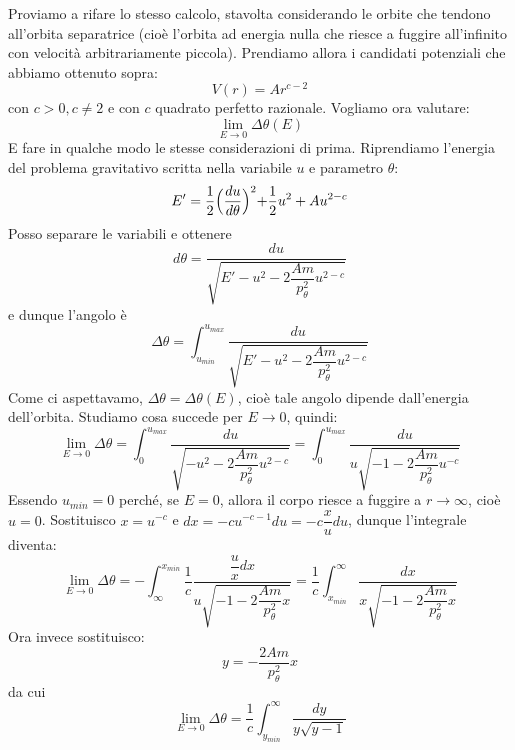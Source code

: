 \documentclass[a4paper,openany]{article}
\begin{document}
	Proviamo a rifare lo stesso calcolo, stavolta considerando le orbite che tendono all'orbita separatrice (cioè l'orbita ad energia nulla che riesce a fuggire all'infinito con velocità arbitrariamente piccola). Prendiamo allora i candidati potenziali che abbiamo ottenuto sopra:
	$$
	V(r)=Ar^{c-2}
	$$
	con $c > 0, c \neq 2$ e con $c$ quadrato perfetto razionale. Vogliamo ora valutare:
	\begin{equation}\label{key}
		\lim_{E\to 0} \Delta \theta (E)
	\end{equation}
	E fare in qualche modo le stesse considerazioni di prima. Riprendiamo l'energia del problema gravitativo scritta nella variabile $u$ e parametro $\theta$:
	\begin{equation}\label{key}
		E' = \dfrac{1}{2}\Bigl(\dfrac{du}{d\theta}\Bigl)^2 + \dfrac{1}{2}u^2 + Au^{2-c}
	\end{equation} 
	Posso separare le variabili e ottenere
	\begin{equation}\label{key}
		d\theta = \dfrac{du}{\sqrt{E'-u^2-2\dfrac{Am}{p_{\theta}^2}u^{2-c}}}
	\end{equation}
	e dunque l'angolo è
	\begin{equation}\label{key}
		\Delta\theta = \int_{u_{min}}^{u_{max}} \dfrac{du}{\sqrt{E'-u^2-2\dfrac{Am}{p_{\theta}^2}u^{2-c}}}
	\end{equation}
	Come ci aspettavamo, $\Delta\theta = \Delta\theta(E)$, cioè tale angolo dipende dall'energia dell'orbita. Studiamo cosa succede per $E\to0$, quindi:
	\begin{equation}\label{key}
		\lim_{E\to 0}\Delta\theta =  \int_{0}^{u_{max}} \dfrac{du}{\sqrt{-u^2-2\dfrac{Am}{p_{\theta}^2}u^{2-c}}} = \int_{0}^{u_{max}} \dfrac{du}{u\sqrt{-1-2\dfrac{Am}{p_{\theta}^2}u^{-c}}} 
	\end{equation}
	Essendo $u_{min} = 0$ perché, se $E=0$, allora il corpo riesce a fuggire a $r\to\infty$, cioè $u=0$. Sostituisco $x = u^{-c}$ e $dx = -c u^{-c-1}du = -c \dfrac{x}{u}du$, dunque l'integrale diventa:
	\begin{equation}\label{key}
		\lim_{E\to 0}\Delta\theta = -\int_{\infty}^{x_{min}} \dfrac{1}{c}\dfrac{\dfrac{u}{x}dx}{u\sqrt{-1-2\dfrac{Am}{p_{\theta}^2}x}}  = \dfrac{1}{c}\int_{x_{min}}^{\infty} \dfrac{dx}{x\sqrt{-1-2\dfrac{Am}{p_{\theta}^2}x}} 
	\end{equation}
	Ora invece sostituisco:
	$$
	y = -\dfrac{2Am}{p_{\theta}^2}x
	$$
	da cui
	\begin{equation}\label{key}
		\lim_{E\to 0}\Delta\theta = \dfrac{1}{c}\int_{y_{min}}^{\infty} \dfrac{dy}{y\sqrt{y-1}} 
	\end{equation}
\end{document}
